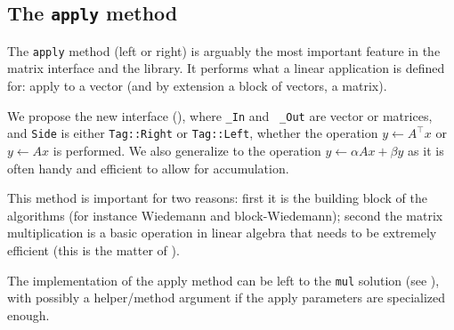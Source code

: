 \subsection{The \texttt{apply} method}\label{ssec:apply}
%
%
\par
%
The \texttt{apply} method (left or right) is arguably the most important
feature in the matrix interface and the \linbox library. It performs what a
linear application is defined for: apply to a vector (and by extension  a block
of vectors, \ie a matrix).
%
\par
%
We propose the new interface (), where {\tt \_In} and {\tt
\_Out} are vector or matrices, and {\tt Side} is either {\tt Tag::Right} or
{\tt Tag::Left}, whether the operation $y \gets A^{\top} x$ or  $y \gets A x$ is
performed. We also generalize to the operation $y \gets \alpha A x + \beta y$ as
it is often handy and efficient to allow for accumulation.
%

%
This method is important for two reasons: first it is the building block of the
\applin algorithms (for instance Wiedemann and block-Wiedemann); second the
matrix multiplication is a basic operation in linear algebra that needs to be
extremely efficient (this is the matter of ).
%
%
\par
%
The implementation of the apply method can be left to the {\tt mul} solution
(see ), with possibly a helper/method argument if the apply
parameters are specialized enough.
%
%
%
